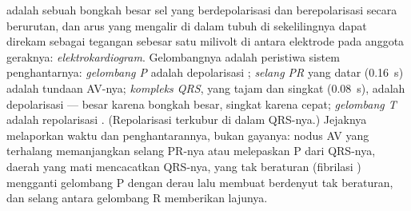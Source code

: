 \begin{proposition}[Elektrokardiogram]\label{prop:b2:heart:ecg}
 adalah sebuah bongkah besar sel yang berdepolarisasi dan
berepolarisasi secara berurutan, dan arus yang mengalir di dalam tubuh
di sekelilingnya dapat direkam sebagai tegangan sebesar satu milivolt
di antara elektrode pada anggota geraknya: \emph{elektrokardiogram}.
Gelombangnya adalah peristiwa sistem penghantarnya: \emph{gelombang P}
adalah depolarisasi ; \emph{selang PR} yang datar
(\qty{0.16}{s}) adalah tundaan AV-nya; \emph{kompleks QRS}, yang tajam
dan singkat (\qty{0.08}{s}), adalah depolarisasi  --- besar
karena bongkah  besar, singkat karena 
cepat; \emph{gelombang T} adalah repolarisasi . (Repolarisasi
 terkubur di dalam QRS-nya.) Jejaknya melaporkan waktu dan
penghantarannya, bukan gayanya: nodus AV yang terhalang memanjangkan
selang PR-nya atau melepaskan P dari QRS-nya, daerah  yang mati
mencacatkan QRS-nya,  yang tak beraturan (fibrilasi )
mengganti gelombang P dengan derau lalu membuat  berdenyut tak
beraturan, dan selang antara gelombang R memberikan lajunya.
\end{proposition}

